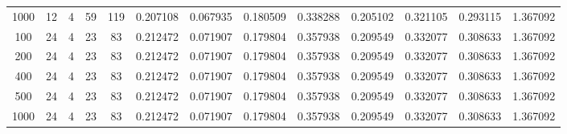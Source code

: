 \begin{table}[h]
\begin{tabular}{ccccccccccccc}
1000 & 12 & 4 & 59 & 119 & 0.207108 & 0.067935 & 0.180509 & 0.338288 & 0.205102 & 0.321105 & 0.293115 & 1.367092 \\
100 & 24 & 4 & 23 & 83 & 0.212472 & 0.071907 & 0.179804 & 0.357938 & 0.209549 & 0.332077 & 0.308633 & 1.367092 \\
200 & 24 & 4 & 23 & 83 & 0.212472 & 0.071907 & 0.179804 & 0.357938 & 0.209549 & 0.332077 & 0.308633 & 1.367092 \\
400 & 24 & 4 & 23 & 83 & 0.212472 & 0.071907 & 0.179804 & 0.357938 & 0.209549 & 0.332077 & 0.308633 & 1.367092 \\
500 & 24 & 4 & 23 & 83 & 0.212472 & 0.071907 & 0.179804 & 0.357938 & 0.209549 & 0.332077 & 0.308633 & 1.367092 \\
1000 & 24 & 4 & 23 & 83 & 0.212472 & 0.071907 & 0.179804 & 0.357938 & 0.209549 & 0.332077 & 0.308633 & 1.367092 \\
\bottomrule
\end{tabular}
\end{table}
